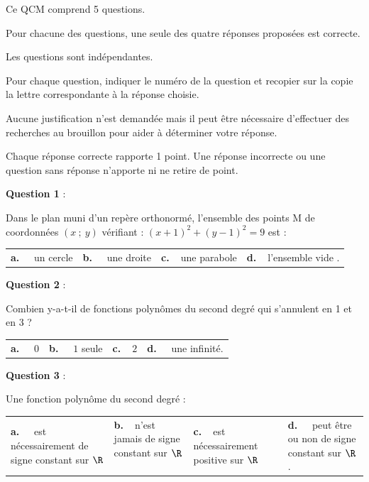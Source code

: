 \medskip

Ce QCM comprend 5 questions. 

Pour chacune des questions, une seule des quatre réponses proposées est correcte. 

Les questions sont indépendantes.

Pour chaque question, indiquer le numéro de la question et recopier sur la copie la lettre correspondante à la réponse choisie.

Aucune justification n'est demandée mais il peut être nécessaire d'effectuer des recherches au brouillon pour aider à déterminer votre réponse.

Chaque réponse correcte rapporte 1 point. Une réponse incorrecte ou une question sans réponse n'apporte ni ne retire de point.

\medskip
\textbf{Question 1} :
\medskip 

Dans le plan muni d'un repère orthonormé, l'ensemble des points M de coordonnées $(x~;~y)$ vérifiant : $(x + 1)^2+(y - 1)^2 = 9$ est :

\begin{center}
\begin{tabularx}{\linewidth}{*{4}{X}}
\textbf{a.~~} un cercle  &\textbf{b.~~} une droite &\textbf{c.~~}une parabole & \textbf{d.~~}l'ensemble vide .
\end{tabularx}
\end{center}

\medskip
\textbf{Question 2} :
\medskip 

Combien y-a-t-il de fonctions polynômes du second degré qui s'annulent en 1 et en 3 ?

\begin{center}
\begin{tabularx}{\linewidth}{*{4}{X}}
\textbf{a.~~} $0$ &\textbf{b.~~} $ 1 $ seule&\textbf{c.~~}$2$& \textbf{d.~~} une infinité.
\end{tabularx}
\end{center}

\medskip
\textbf{Question 3} :
\medskip 

Une fonction polynôme du second degré :

\begin{center}
\begin{tabularx}{\linewidth}{*{4}{X}}
\textbf{a.~~} est nécessairement de signe constant sur $\R$ &\textbf{b.~~}n'est jamais de signe constant sur $\R$ $ $&\textbf{c.~~}est nécessairement positive sur $\R$& \textbf{d.~~} peut être ou non de signe constant sur $\R$.
\end{tabularx}
\end{center}


